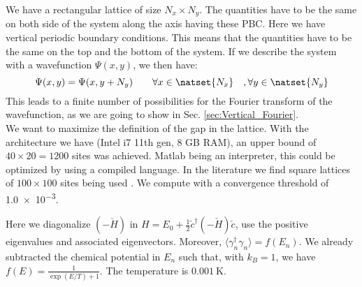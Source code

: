 \documentclass[../main.tex]{subfile}
\begin{document}
We have a rectangular lattice of size $N_x\times N_y$. The quantities have to be the same on both side of the system along the axis having these PBC.
Here we have vertical periodic boundary conditions. This means that the quantities have to be the same on the top and the bottom of the system. 
If we describe the system with a wavefunction $\Psi(x,y)$, we then have:
\begin{equation}
    \Psi(x,y) = \Psi(x,y+N_y) \quad\quad \forall x\in\natset{N_x}\quad, \forall y \in \natset{N_y}
\end{equation} 
This leads to a finite number of possibilities for the Fourier transform of the wavefunction, as we are going to show in Sec. \ref{sec:Vertical_Fourier}.\\

We want to maximize the definition of the gap in the lattice. With the architecture we have (Intel i7 11th gen, 8 GB RAM),
an upper bound of $40\times20=1200$ sites was achieved. Matlab being an interpreter, this could be optimized by using a compiled language.
In the literature we find square lattices of $100\times100$ sites being used \cite{Mjos2019}. We compute with a convergence threshold of \num{1.0e-3}.

Here we diagonalize $(-\check{H})$ in $H = E_0 +\frac{1}{2} \check{c}^{\dagger}(-\check{H})\check{c}$, use the positive 
eigenvalues and associated eigenvectors. Moreover, $\langle \gamma^{\dagger}_n\gamma_n\rangle = f(E_n)$. We already subtracted the chemical
potential in $E_n$ such that, with $k_B=1$, we have $f(E)= \frac{1}{\exp(E/T)+1}$. The temperature is $\SI{0.001}{\kelvin}$.\\
\end{document}
